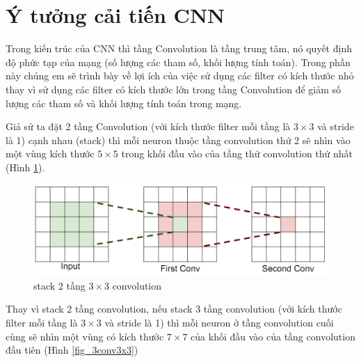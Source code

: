 \documentclass[a4paper,12pt]{report}
\begin{document}
\section{Ý tưởng cải tiến CNN \cite{slidesangdv}}
Trong kiến trúc của CNN thì tầng Convolution là tầng trung tâm, nó quyết định độ phức tạp của mạng (số lượng các tham số, khối lượng tính toán). Trong phần này chúng em sẽ trình bày về lợi ích của việc sử dụng các filter có kích thước nhỏ thay vì sử dụng các filter có kích thước lớn trong tầng Convolution để giảm số lượng các tham số và khối lượng tính toán trong mạng.
\par Giả sử ta đặt 2 tầng Convolution (với kích thước filter mỗi tầng là $3 \times 3$ và stride là 1) cạnh nhau (stack) thì mỗi neuron thuộc tầng convolution thứ 2 sẽ nhìn vào một vùng kích thước $5 \times 5$ trong khối đầu vào của tầng thứ convolution thứ nhất (Hình \ref{fig_2conv3x3}). 
\begin{figure}[H]
\includegraphics[scale=0.5]{2conv3x3.png}
\caption{stack 2 tầng $3 \times 3$ convolution}
\label{fig_2conv3x3}
\end{figure}
\par Thay vì stack 2 tầng convolution, nếu stack 3 tầng convolution (với kích thước filter mỗi tầng là $3 \times 3$ và stride là 1) thì mỗi neuron ở tầng convolution cuối cùng sẽ nhìn một vùng có kích thước $7 \times 7$ của khối đầu vào của tầng convolution đầu tiên (Hình \ref{fig_3conv3x3})
\end{document}
